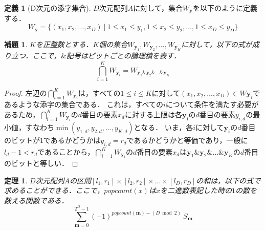\documentclass[12pt]{jsreport}
\theoremstyle{plain} %
\newtheorem{theorem}{定理}
\newtheorem{lemma}{補題}
\theoremstyle{definition}
\newtheorem{definition}{定義}
\begin{document}
\begin{definition}[D次元の添字集合]
    $D$次元配列$A$に対して，集合$W_{\mathbf{y}}$を以下のように定義する．
    \begin{equation}
        W_{\mathbf{y}} = \{(x_1, x_2, \ldots, x_D) \ | \ 1 \leq x_1 \leq y_1, 1 \leq x_2 \leq y_2, \ldots, 1 \leq x_D \leq y_D\}
    \end{equation}
\end{definition}

\begin{lemma}
    $K$を正整数とする．$K$個の集合$W_{\mathbf{y}_1}, W_{\mathbf{y}_2}, \ldots, W_{\mathbf{y}_K}$に対して，以下の式が成り立つ．ここで，$\&$記号はビットごとの論理積を表す．
    \begin{equation}
        \bigcap_{i=1}^{K} W_{\mathbf{y}_i} = W_{\mathbf{y}_1 \& \mathbf{y}_2 \& \ldots \& \mathbf{y}_K}
    \end{equation}
\end{lemma}

\begin{proof}
    左辺の$\bigcap_{i=1}^{K} W_{\mathbf{y}_i}$は，すべての$1 \leq i \leq K$に対して$(x_1, x_2, \ldots, x_D) \in W{\mathbf{y}_i}$であるような添字の集合である．
    これは，すべての$i$について条件を満たす必要があるため，$\bigcap_{i=1}^{K} W_{\mathbf{y}_i}$の$d$番目の要素$x_d$に対する上限は各$\mathbf{y_i}$の$d$番目の要素$y_{i,d}$の最小値，すなわち$\min(y_{1,d}, y_{2,d}, \ldots, y_{K,d})$となる．
    いま，各$i$に対して$\mathbf{y}_i$の$d$番目のビットが$1$であるかどうかは$y_{i,d} = r_d$であるかどうかと等価であり，一般に$l_d-1 < r_d$であることから，$\bigcap_{i=1}^{K} W_{\mathbf{y}_i}$の$d$番目の要素$x_d$は$\mathbf{y}_1 \& \mathbf{y}_2 \& \ldots \& \mathbf{y}_K$の$d$番目のビットと等しい．
\end{proof}

\begin{theorem}
    $D$次元配列$A$の区間$[l_1, r_1] \times [l_2, r_2] \times \ldots \times [l_D, r_D]$の和は，以下の式で求めることができる．ここで，$popcount(x)$は$x$を二進数表記した時の$1$の数を数える関数である．
    \begin{equation}
        \sum_{\mathbf{m}=0}^{2^D-1} (-1)^{popcount(\mathbf{m}) - (D \bmod 2)} \ S_{\mathbf{m}}
    \end{equation}
\end{theorem}
\end{document}
